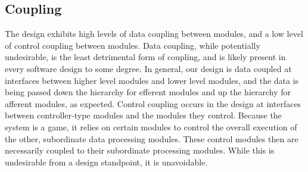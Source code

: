 \documentclass{article}
\begin{document}
	\subsection{Coupling}
		The design exhibits high levels of data coupling between modules, and a low level of control coupling between modules. Data coupling, while potentially undesirable, is the least detrimental form of coupling, and is likely present in every software design to some degree. In general, our design is data coupled at interfaces between higher level modules and lower level modules, and the data is being passed down the hierarchy for efferent modules and up the hierarchy for afferent modules, as expected. Control coupling occurs in the design at interfaces between controller-type modules and the modules they control. Because the system is a game, it relies on certain modules to control the overall execution of the other, subordinate data processing modules. These control modules then are necessarily coupled to their subordinate processing modules. While this is undesirable from a design standpoint, it is unavoidable. 
\end{document}
